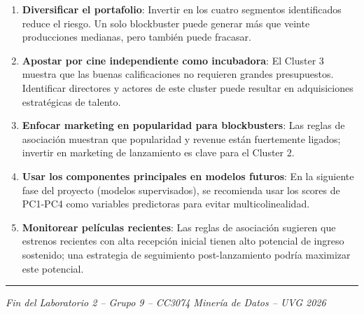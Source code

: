 \documentclass[
]{article}
\providecommand{\tightlist}{%
  \setlength{\itemsep}{0pt}\setlength{\parskip}{0pt}}
\begin{document}
\begin{enumerate}
\def\labelenumi{\arabic{enumi}.}
\tightlist
\item
  \textbf{Diversificar el portafolio}: Invertir en los cuatro segmentos
  identificados reduce el riesgo. Un solo blockbuster puede generar más
  que veinte producciones medianas, pero también puede fracasar.\\
\item
  \textbf{Apostar por cine independiente como incubadora}: El Cluster 3
  muestra que las buenas calificaciones no requieren grandes
  presupuestos. Identificar directores y actores de este cluster puede
  resultar en adquisiciones estratégicas de talento.\\
\item
  \textbf{Enfocar marketing en popularidad para blockbusters}: Las
  reglas de asociación muestran que popularidad y revenue están
  fuertemente ligados; invertir en marketing de lanzamiento es clave
  para el Cluster 2.\\
\item
  \textbf{Usar los componentes principales en modelos futuros}: En la
  siguiente fase del proyecto (modelos supervisados), se recomienda usar
  los scores de PC1-PC4 como variables predictoras para evitar
  multicolinealidad.\\
\item
  \textbf{Monitorear películas recientes}: Las reglas de asociación
  sugieren que estrenos recientes con alta recepción inicial tienen alto
  potencial de ingreso sostenido; una estrategia de seguimiento
  post-lanzamiento podría maximizar este potencial.
\end{enumerate}

\begin{center}\rule{0.5\linewidth}{0.5pt}\end{center}

\emph{Fin del Laboratorio 2 -- Grupo 9 -- CC3074 Minería de Datos -- UVG
2026}
\end{document}
